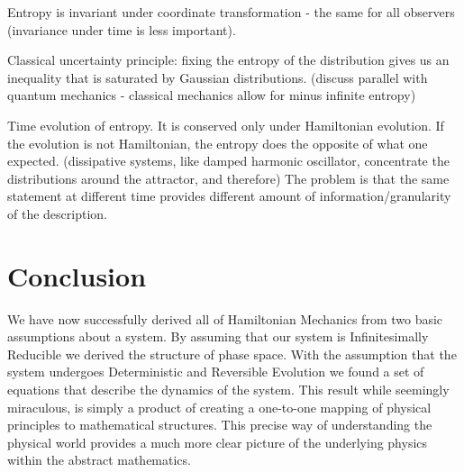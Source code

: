 \documentclass{article}[a4paper]
\begin{document}
Entropy is invariant under coordinate transformation - the same for all observers (invariance under time is less important).

Classical uncertainty principle: fixing the entropy of the distribution gives us an inequality that is saturated by Gaussian distributions. (discuss parallel with quantum mechanics - classical mechanics allow for minus infinite entropy)

Time evolution of entropy. It is conserved only under Hamiltonian evolution. If the evolution is not Hamiltonian, the entropy does the opposite of what one expected. (dissipative systems, like damped harmonic oscillator, concentrate the distributions around the attractor, and therefore) The problem is that the same statement at different time provides different amount of information/granularity of the description.
\fi

\section{Conclusion}
	
	We have now successfully derived all of Hamiltonian Mechanics from two basic assumptions about a system. By assuming that our system is Infinitesimally Reducible we derived the structure of phase space. With the assumption that the system undergoes Deterministic and Reversible Evolution we found a set of equations that describe the dynamics of the system. This result  while seemingly miraculous, is simply a product of creating a one-to-one mapping of physical principles to mathematical structures. This precise way of understanding the physical world provides a much more clear picture of the underlying physics within the abstract mathematics.
	





\end{document}
